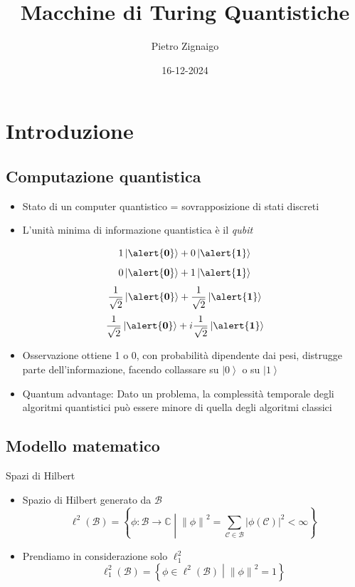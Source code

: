\documentclass{beamer}
\title
{Macchine di Turing Quantistiche}
\author
{Pietro Zignaigo}
\institute
{Università di Genova}
\date
{16-12-2024}
\newcommand{\spacedmiddle}[1]{\mathrel{}\middle#1\mathrel{}}
\newcommand{\ket}[1]{\left | #1 \right \rangle}
\newcommand{\hil}{\ell^{2}}
\newcommand{\hiluninorm}{\hil_{1}}
\newcommand{\Zero}{\alert{\mathbf{0}}}
\newcommand{\One}{\alert{\mathbf{1}}}
\begin{document}
\begin{frame}
	\titlepage
\end{frame}

\begin{frame}
	\tableofcontents
\end{frame}

\section{Introduzione}

\subsection{Computazione quantistica}

\begin{frame}{\subsecname}{}
	\begin{itemize}
		\item Stato di un computer quantistico = sovrapposizione di stati discreti
		\pause \item L'unità minima di informazione quantistica è il \textit{qubit}
	\end{itemize}
	\[ 1 \ket{\Zero} + 0 \ket{\One} \]
	\[ 0 \ket{\Zero} +  1 \ket{\One} \]
	\[ \frac{1}{\sqrt{2}} \ket{\Zero} + \frac{1}{\sqrt{2}} \ket{\One} \]
	\[ \frac{1}{\sqrt{2}} \ket{\Zero} + i \frac{1}{\sqrt{2}} \ket{\One} \]
\end{frame}

\begin{frame}{\subsecname}{}
	\begin{itemize}
		\item Osservazione ottiene 1 o 0, con probabilità dipendente dai pesi, distrugge parte dell'informazione, facendo collassare su \( \ket{0} \) o su \( \ket{1} \)
		\item Quantum advantage: Dato un problema, la complessità temporale degli algoritmi quantistici può essere minore di quella degli algoritmi classici
	\end{itemize}
\end{frame}

\subsection{Modello matematico}

\begin{frame}{\subsecname}{Spazi di Hilbert}
	\begin{itemize}
		\item \alert{Spazio di Hilbert} generato da \( \mathcal{B} \)
		\[ \hil \left ( \mathcal{B} \right ) = \left \{ \phi : \mathcal{B} \rightarrow \mathbb{C} \spacedmiddle | \left \| \phi \right \|^{2} = \sum_{\mathcal{C} \in \mathcal{B}} \left | \phi \left ( \mathcal{C} \right ) \right |^{2} < \infty \right \}\]
		\item Prendiamo in considerazione solo \(\hiluninorm\)
		\[ \hiluninorm \left ( \mathcal{B} \right ) = \left \{ \phi \in \hil \left ( \mathcal{B} \right ) \spacedmiddle | \left \| \phi \right \|^{2} = 1 \right \}\]
	\end{itemize}
\end{frame}
\end{document}
